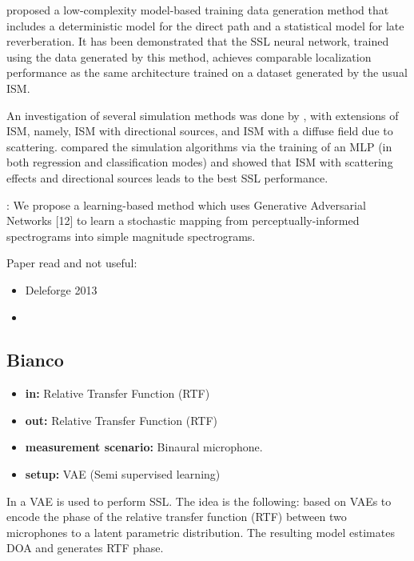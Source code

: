\documentclass{article}
\begin{document}
\cite{hubner2021efficient} proposed a low-complexity model-based training data generation method that includes a deterministic model for the direct path and a statistical model for late reverberation. It has been demonstrated that the SSL neural network, trained using the data generated by this method, achieves comparable localization performance as the same architecture trained on a dataset generated by the usual ISM.

An investigation of several simulation methods was done by \cite{gelderblom2021synthetic}, with extensions of ISM, namely, ISM with directional sources, and ISM with a diffuse field due to scattering. \cite{gelderblom2021synthetic} compared the simulation algorithms via the training of an MLP (in both regression and classification modes) and showed that ISM with scattering effects and directional sources leads to the best SSL performance.

\cite{neekhara2019expediting} : We propose a learning-based method which uses Generative Adversarial Networks [12] to learn a stochastic mapping from perceptually-informed spectrograms into simple magnitude spectrograms.

Paper read and not useful:

\begin{itemize}
    \item Deleforge 2013 \cite{deleforge2013variational}
    \item 
\end{itemize}

\subsection{Bianco}

\begin{itemize} 
    \item \textbf{in:} Relative Transfer Function (RTF)
    \item \textbf{out:} Relative Transfer Function (RTF)
    \item \textbf{measurement scenario:} Binaural microphone.
    \item \textbf{setup:} VAE (Semi supervised learning)
\end{itemize}


In \cite{bianco2020semi} a VAE is used to perform SSL. The idea is the following: based on VAEs to encode the phase of the relative transfer function (RTF) between two microphones to a latent parametric distribution. The resulting model estimates DOA and generates RTF phase.
\end{document}
